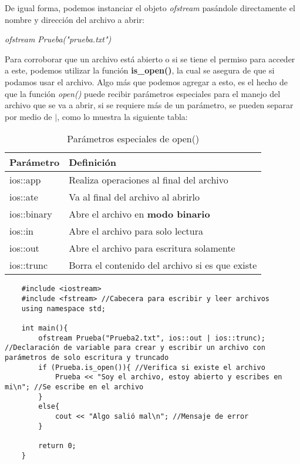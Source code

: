 De igual forma, podemos instanciar el objeto \textit{ofstream} pasándole directamente el nombre y dirección del archivo a abrir:\begin{center}\textit{ofstream Prueba("prueba.txt")}\end{center}
Para corroborar que un archivo está abierto o si se tiene el permiso para acceder a este, podemos utilizar la función \textbf{is\_open()}, la cual se asegura de que si podamos usar el archivo. Algo más que podemos agregar a esto, es el hecho de que la función \textit{open()} puede recibir parámetros especiales para el manejo del archivo que se va a abrir, si se requiere más de un parámetro, se pueden separar por medio de $|$, como lo muestra la siguiente tabla:
\begin{table}[H]
    \begin{center}
        \caption{Parámetros especiales de open()}
        \label{tab: 9}
        \begin{tabular}{l l}
            \hline
            \textbf{Parámetro}&\textbf{Definición} \\
            \hline
            ios::app    & Realiza operaciones al final del archivo \\
            ios::ate    & Va al final del archivo al abrirlo \\
            ios::binary & Abre el archivo en \textbf{modo binario} \\
            ios::in     & Abre el archivo para solo lectura \\
            ios::out    & Abre el archivo para escritura solamente \\
            ios::trunc  & Borra el contenido del archivo si es que existe \\
            \hline
        \end{tabular}
    \end{center}
\end{table}
\begin{lstlisting}
    #include <iostream>
    #include <fstream> //Cabecera para escribir y leer archivos
    using namespace std;
    
    int main(){
        ofstream Prueba("Prueba2.txt", ios::out | ios::trunc); //Declaración de variable para crear y escribir un archivo con parámetros de solo escritura y truncado
        if (Prueba.is_open()){ //Verifica si existe el archivo
            Prueba << "Soy el archivo, estoy abierto y escribes en mi\n"; //Se escribe en el archivo
        }
        else{
            cout << "Algo salió mal\n"; //Mensaje de error
        }
        
        return 0;
    }
\end{lstlisting}

